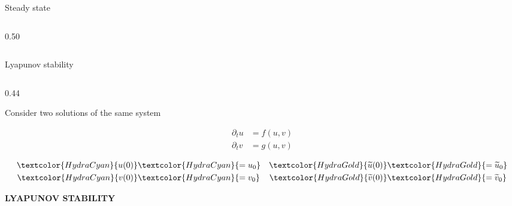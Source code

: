 \begin{frame}{Steady state}
\begin{columns}[c,onlytextwidth]
\begin{column}{0.50\textwidth}
    \end{column}

  \end{columns}

\end{frame}


\begin{frame}{Lyapunov stability}

  \vspace{-0.54cm}

  \begin{columns}[c,onlytextwidth]

    \begin{column}{0.44\textwidth}
      {\color{HydraMuted}\fontsize{7.8}{9.6}\selectfont
        Consider two solutions of the same system
      \par}

      \vspace{-0.18cm}

      {\color{HydraWhite}\fontsize{9.7}{12.4}\selectfont
      \begin{align*}
        \partial_t u&=f(u,v)
        \\
        \partial_t v&=g(u,v)
      \end{align*}
      }

      \vspace{-1.28cm}

      {\fontsize{8.8}{11.2}\selectfont
      \begin{align*}
        \textcolor{HydraCyan}{u(0)}
        &\textcolor{HydraCyan}{=u_0}
        &
        \textcolor{HydraGold}{\widetilde u(0)}
        &\textcolor{HydraGold}{=\widetilde u_0}
        \\
        \textcolor{HydraCyan}{v(0)}
        &\textcolor{HydraCyan}{=v_0}
        &
        \textcolor{HydraGold}{\widetilde v(0)}
        &\textcolor{HydraGold}{=\widetilde v_0}
      \end{align*}
      }
      \par
      \vspace{0.1cm}

      {\color{HydraGold}\bfseries\fontsize{7.7}{9.2}\selectfont
        LYAPUNOV STABILITY\par}


\end{column}
\end{columns}
\end{frame}
